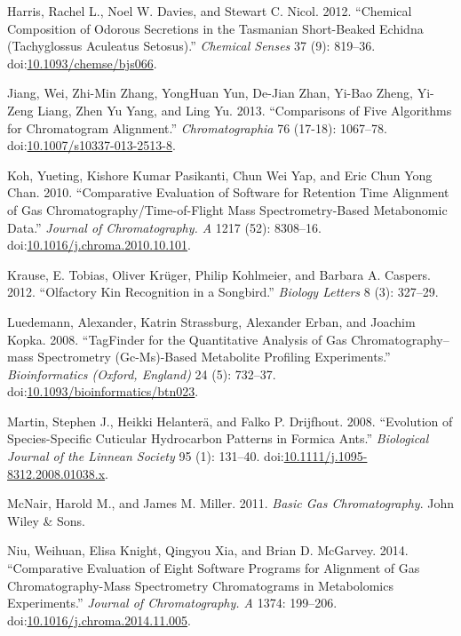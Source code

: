 \documentclass[]{article}
\begin{document}
\hypertarget{ref-Harris.2012}{}
Harris, Rachel L., Noel W. Davies, and Stewart C. Nicol. 2012.
``Chemical Composition of Odorous Secretions in the Tasmanian
Short-Beaked Echidna (Tachyglossus Aculeatus Setosus).'' \emph{Chemical
Senses} 37 (9): 819--36.
doi:\href{https://doi.org/10.1093/chemse/bjs066}{10.1093/chemse/bjs066}.

\hypertarget{ref-Jiang.2013}{}
Jiang, Wei, Zhi-Min Zhang, YongHuan Yun, De-Jian Zhan, Yi-Bao Zheng,
Yi-Zeng Liang, Zhen Yu Yang, and Ling Yu. 2013. ``Comparisons of Five
Algorithms for Chromatogram Alignment.'' \emph{Chromatographia} 76
(17-18): 1067--78.
doi:\href{https://doi.org/10.1007/s10337-013-2513-8}{10.1007/s10337-013-2513-8}.

\hypertarget{ref-Koh.2010}{}
Koh, Yueting, Kishore Kumar Pasikanti, Chun Wei Yap, and Eric Chun Yong
Chan. 2010. ``Comparative Evaluation of Software for Retention Time
Alignment of Gas Chromatography/Time-of-Flight Mass Spectrometry-Based
Metabonomic Data.'' \emph{Journal of Chromatography. A} 1217 (52):
8308--16.
doi:\href{https://doi.org/10.1016/j.chroma.2010.10.101}{10.1016/j.chroma.2010.10.101}.

\hypertarget{ref-Krause.2012}{}
Krause, E. Tobias, Oliver Krüger, Philip Kohlmeier, and Barbara A.
Caspers. 2012. ``Olfactory Kin Recognition in a Songbird.''
\emph{Biology Letters} 8 (3): 327--29.

\hypertarget{ref-Luedemann.2008}{}
Luedemann, Alexander, Katrin Strassburg, Alexander Erban, and Joachim
Kopka. 2008. ``TagFinder for the Quantitative Analysis of Gas
Chromatography--mass Spectrometry (Gc-Ms)-Based Metabolite Profiling
Experiments.'' \emph{Bioinformatics (Oxford, England)} 24 (5): 732--37.
doi:\href{https://doi.org/10.1093/bioinformatics/btn023}{10.1093/bioinformatics/btn023}.

\hypertarget{ref-Martin.2008}{}
Martin, Stephen J., Heikki Helanterä, and Falko P. Drijfhout. 2008.
``Evolution of Species-Specific Cuticular Hydrocarbon Patterns in
Formica Ants.'' \emph{Biological Journal of the Linnean Society} 95 (1):
131--40.
doi:\href{https://doi.org/10.1111/j.1095-8312.2008.01038.x}{10.1111/j.1095-8312.2008.01038.x}.

\hypertarget{ref-McNair.2011}{}
McNair, Harold M., and James M. Miller. 2011. \emph{Basic Gas
Chromatography}. John Wiley \& Sons.

\hypertarget{ref-Niu.2014}{}
Niu, Weihuan, Elisa Knight, Qingyou Xia, and Brian D. McGarvey. 2014.
``Comparative Evaluation of Eight Software Programs for Alignment of Gas
Chromatography-Mass Spectrometry Chromatograms in Metabolomics
Experiments.'' \emph{Journal of Chromatography. A} 1374: 199--206.
doi:\href{https://doi.org/10.1016/j.chroma.2014.11.005}{10.1016/j.chroma.2014.11.005}.
\end{document}

